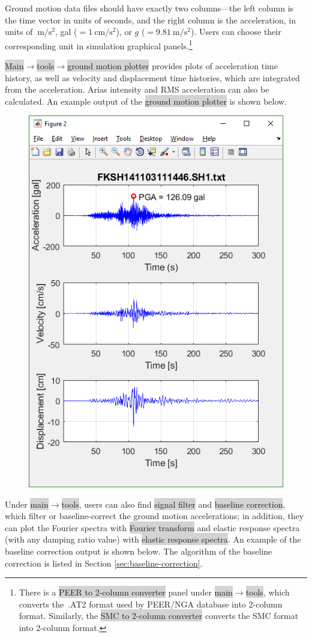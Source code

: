\documentclass[11pt,letterpaper]{article}
\newcommand{\panel}[1]{\colorbox{lightgray}{\textsf{#1}}}
\newcommand{\ein}[1]{~\mathrm{#1}}  %
\begin{document}
Ground motion data files should have exactly two columns---the left column is the time vector in units of seconds, and the right column is the acceleration, in units of $\ein{m/s^2}$, gal ($=1\ein{cm/s^2}$), or $g$ ($=9.81\ein{m/s^2}$). Users can choose their corresponding unit in simulation graphical panels.\footnote{There is a \panel{PEER to 2-column converter} panel under \panel{main}$\rightarrow$\panel{tools}, which converts the~\textsf{.AT2} format used by PEER/NGA database into 2-column format. Similarly, the \panel{SMC to 2-column converter} converts the SMC format into 2-column format.}

\panel{Main}$\rightarrow$\panel{tools}$\rightarrow$\panel{ground motion plotter} provides plots of acceleration time history, as well as velocity and displacement time histories, which are integrated from the acceleration. Arias intensity and RMS acceleration can also be calculated. An example output of the \panel{ground motion plotter} is shown below.

\begin{figure}[H]
\centering
  \includegraphics[width=.62\textwidth]{ground_motion_plot.png}\\
\end{figure}

Under \panel{main}$\rightarrow$\panel{tools}, users can also find \panel{signal filter} and \panel{baseline correction}, which filter or baseline-correct the ground motion accelerations; in addition, they can plot the Fourier spectra with \panel{Fourier transform} and elastic response spectra (with any damping ratio value) with \panel{elastic response spectra}. An example of the baseline correction output is shown below. The algorithm of the baseline correction is listed in Section \ref{sec:baseline-correction}.
\end{document}
